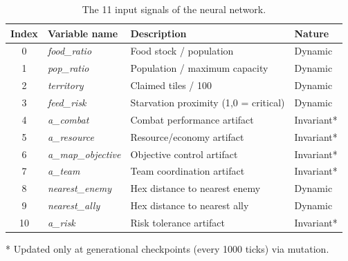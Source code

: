 \begin{table}[h]
  \centering
  \caption{The 11 input signals of the neural network.}
  \label{tab:neurosim-inputs}
  \begin{tabular}{|c|l|l|l|}
    \hline
    \textbf{Index} & \textbf{Variable name} & \textbf{Description} & \textbf{Nature} \\
    \hline
    0 & \textit{food\_ratio}         & Food stock / population                    & Dynamic \\
    1 & \textit{pop\_ratio}          & Population / maximum capacity               & Dynamic \\
    2 & \textit{territory}           & Claimed tiles / 100                         & Dynamic \\
    3 & \textit{feed\_risk}          & Starvation proximity (1{,}0 = critical)    & Dynamic \\
    4 & \textit{a\_combat}           & Combat performance artifact                  & Invariant* \\
    5 & \textit{a\_resource}         & Resource/economy artifact                    & Invariant* \\
    6 & \textit{a\_map\_objective}   & Objective control artifact                   & Invariant* \\
    7 & \textit{a\_team}             & Team coordination artifact                   & Invariant* \\
    8 & \textit{nearest\_enemy}      & Hex distance to nearest enemy               & Dynamic \\
    9 & \textit{nearest\_ally}       & Hex distance to nearest ally                & Dynamic \\
   10 & \textit{a\_risk}             & Risk tolerance artifact                      & Invariant* \\
    \hline
  \end{tabular}
  \begin{flushleft}
    \small{* Updated only at generational checkpoints (every 1000 ticks) via mutation.}
  \end{flushleft}
\end{table}

